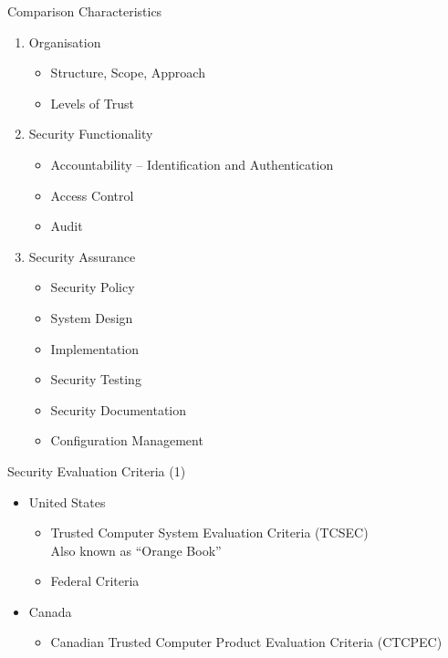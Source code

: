 \documentclass[xcolor=dvipsname,t]{beamer}
\begin{document}
\begin{frame} {Comparison Characteristics}
    \begin{enumerate}
        \item Organisation
            \begin{itemize}
                \item Structure, Scope, Approach
                \item Levels of Trust
            \end{itemize}
        \item Security Functionality
            \begin{itemize}
                \item Accountability -- Identification and Authentication
                \item Access Control
                \item Audit
            \end{itemize}
        \item Security Assurance
            \begin{itemize}
                \item Security Policy
                \item System Design
                \item Implementation
                \item Security Testing
                \item Security Documentation
                \item Configuration Management
            \end{itemize}
    \end{enumerate}
\end{frame}

\begin{frame} {Security Evaluation Criteria (1)}
    \begin{itemize}
        \item United States
            \begin{itemize}
                \item Trusted Computer System Evaluation Criteria (TCSEC)\\
                      Also known as ``Orange Book''
                \item Federal Criteria
            \end{itemize}
        \item Canada
            \begin{itemize}
               \item Canadian Trusted Computer Product Evaluation Criteria (CTCPEC) 
            \end{itemize}
    \end{itemize}
\end{frame}
\end{document}
